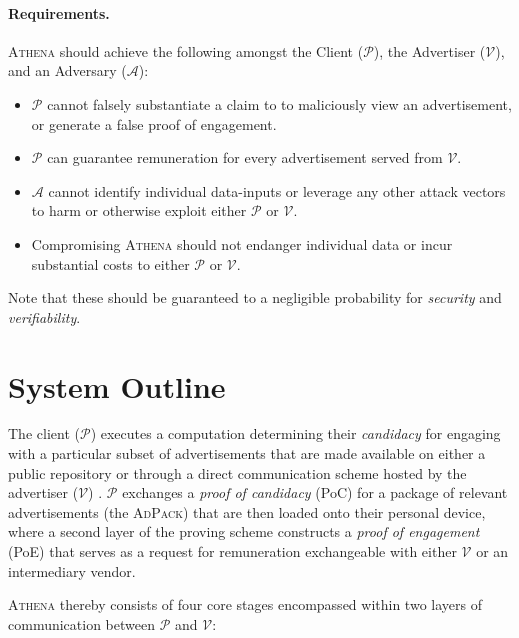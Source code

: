 \documentclass{article}
\begin{document}
	\paragraph{Requirements.}  \textsc{Athena} should achieve the following amongst the Client ($\mathcal{P}$), the Advertiser ($\mathcal{V}$), and an Adversary ($\mathcal{A}$):
			
			\begin{itemize}[label = $\cdot$]
				
				\item $\mathcal{P}$ cannot falsely substantiate a claim to to maliciously view an advertisement, or generate a false proof of engagement.
				\item $\mathcal{P}$ can guarantee remuneration for every advertisement served from  $\mathcal{V}$.
				\item $\mathcal{A}$ cannot identify individual data-inputs or leverage any other attack vectors to harm or otherwise exploit either $\mathcal{P}$ or $\mathcal{V}$.
				\item Compromising \textsc{Athena} should not endanger individual data or incur substantial costs to either $\mathcal{P}$  or  $\mathcal{V}$.
				
			\end{itemize}
	
		Note that these should be guaranteed to a negligible probability for \textit{security} and \textit{verifiability}.
	
\pagebreak
		
	\section{System Outline}
	
		The client ($\mathcal{P}$) executes a computation determining their \textit{candidacy} for engaging with a particular subset of advertisements that are made available on either a public repository or through a direct communication scheme hosted by the advertiser ($\mathcal{V}$) . $\mathcal{P}$ exchanges a \textit{proof of candidacy} (PoC) for a package of relevant advertisements (the \textsc{AdPack}) that are then loaded onto their personal device, where a second layer of the proving scheme constructs a \textit{proof of engagement} (PoE) that serves as a request for remuneration exchangeable with either $\mathcal{V}$ or an intermediary vendor.
		
		\textsc{Athena} thereby consists of four core stages encompassed within two layers of communication between $\mathcal{P}$ and $\mathcal{V}$:
		
\end{document}

